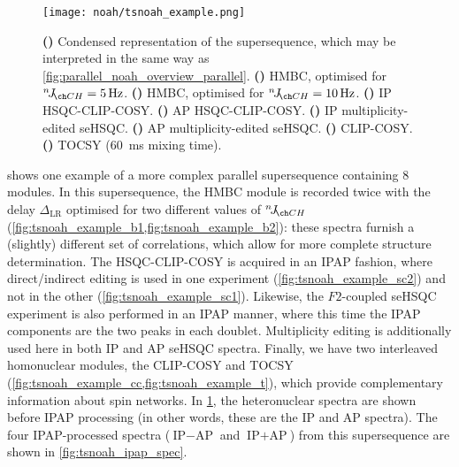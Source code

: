 \begin{figure}[!ht]
    \centering
    \texttt{[image: noah/tsnoah\_example.png]}%
    {\label{fig:tsnoah_example_overall}}%
    {\label{fig:tsnoah_example_b1}}%
    {\label{fig:tsnoah_example_b2}}%
    {\label{fig:tsnoah_example_sc1}}%
    {\label{fig:tsnoah_example_sc2}}%
    {\label{fig:tsnoah_example_s1}}%
    {\label{fig:tsnoah_example_s2}}%
    {\label{fig:tsnoah_example_cc}}%
    {\label{fig:tsnoah_example_t}}%
    \caption[Spectra from a NOAH-8 `parallel' supersequence]{
        \textbf{()} Condensed representation of the supersequence, which may be interpreted in the same way as \cref{fig:parallel_noah_overview_parallel}.
        \textbf{()} HMBC, optimised for $\nJ{CH} = \qty{5}{\Hz}$.
        \textbf{()} HMBC, optimised for $\nJ{CH} = \qty{10}{\Hz}$.
        \textbf{()} IP HSQC-CLIP-COSY.
        \textbf{()} AP HSQC-CLIP-COSY.
        \textbf{()} IP multiplicity-edited seHSQC.
        \textbf{()} AP multiplicity-edited seHSQC.
        \textbf{()} CLIP-COSY.
        \textbf{()} TOCSY (\qty{60}{\ms} mixing time).
    }
    \label{fig:tsnoah_example}
\end{figure}

 shows one example of a more complex parallel supersequence containing 8 modules.
In this supersequence, the HMBC module is recorded twice with the delay $\Delta_\text{LR}$ optimised for two different values of $\nJ{CH}$ (\cref{fig:tsnoah_example_b1,fig:tsnoah_example_b2}): these spectra furnish a (slightly) different set of correlations, which allow for more complete structure determination.
The HSQC-CLIP-COSY is acquired in an IPAP fashion, where direct/indirect editing is used in one experiment (\cref{fig:tsnoah_example_sc2}) and not in the other (\cref{fig:tsnoah_example_sc1}).
Likewise, the $F2$-coupled seHSQC experiment is also performed in an IPAP manner, where this time the IPAP components are the two peaks in each doublet.
Multiplicity editing is additionally used here in both IP and AP seHSQC spectra.
Finally, we have two interleaved homonuclear modules, the CLIP-COSY and TOCSY (\cref{fig:tsnoah_example_cc,fig:tsnoah_example_t}), which provide complementary information about spin networks.
In \cref{fig:tsnoah_example}, the heteronuclear spectra are shown before IPAP processing (in other words, these are the IP and AP spectra).
The four IPAP-processed spectra ($\text{IP}-\text{AP}$ and $\text{IP}+\text{AP}$) from this supersequence are shown in \cref{fig:tsnoah_ipap_spec}.

